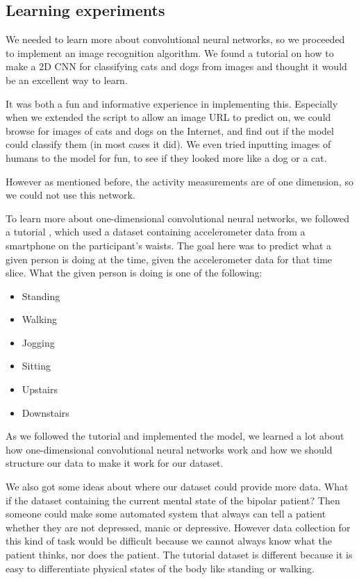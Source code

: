 \subsection{Learning experiments}

We needed to learn more about convolutional neural networks, so we proceeded to implement an image recognition algorithm. We found a tutorial on how to make a 2D CNN for classifying cats and dogs from images \cite{2d_cnn} and thought it would be an excellent way to learn.

It was both a fun and informative experience in implementing this. Especially when we extended the script to allow an image URL to predict on, we could browse for images of cats and dogs on the Internet, and find out if the model could classify them (in most cases it did). We even tried inputting images of humans to the model for fun, to see if they looked more like a dog or a cat.

However as mentioned before, the activity measurements are of one dimension, so we could not use this network.


To learn more about one-dimensional convolutional neural networks, we followed a tutorial \cite{1d_cnn}, which used a dataset containing accelerometer data from a smartphone on the participant's waists. The goal here was to predict what a given person is doing at the time, given the accelerometer data for that time slice. What the given person is doing is one of the following:

\begin{itemize}
  \item Standing
  \item Walking
  \item Jogging
  \item Sitting
  \item Upstairs
  \item Downstairs
\end{itemize}

As we followed the tutorial and implemented the model, we learned a lot about how one-dimensional convolutional neural networks work and how we should structure our data to make it work for our dataset.

We also got some ideas about where our dataset could provide more data. What if the dataset containing the current mental state of the bipolar patient? Then someone could make some automated system that always can tell a patient whether they are not depressed, manic or depressive. However data collection for this kind of task would be difficult because we cannot always know what the patient thinks, nor does the patient. The tutorial dataset is different because it is easy to differentiate physical states of the body like standing or walking.
